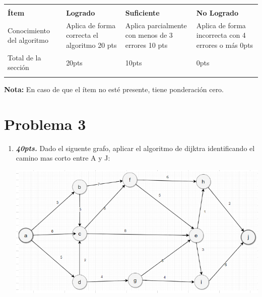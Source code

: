 \documentclass{exam}
\begin{document}
\begin{enumerate}
\begin{questions}
\begin{enumerate}
    \end{enumerate}
  \end{questions}

  \begin{table}[H]
    \centering
    \begin{tabular}{
      !{\color{gray!50}\vrule}p{3.9cm}
      !{\color{gray!50}\vrule}p{3.6cm}
      !{\color{gray!50}\vrule}p{3.6cm}
      !{\color{gray!50}\vrule}p{3.6cm}
      !{\color{gray!50}\vrule}}  \hline
       \\  \hline
      \textbf{Ítem} & \textbf{Logrado} & \textbf{Suficiente} & \textbf{No Logrado}\\  \hline
      Conocimiento del algoritmo &
      Aplica de forma correcta el algoritmo 20 pts   &
      Aplica parcialmente con menos de 3 errores 10 pts  &
      Aplica de forma incorrecta con 4 errores o más 0pts\\  \hline
      Total de la sección &  20pts & 10pts & 0pts\\  \hline
    \end{tabular}
    \label{tbl:1}
  \end{table}
  \vspace{-5mm}
  \textbf{Nota:} En caso de que el {í}tem no est{é} presente, tiene ponderaci{ó}n cero.

  \newpage
  \vspace{-7mm}
  \section{\textbf{Problema 3}}
  \noindent
  \begin{questions}

    \begin{enumerate}

      \item \textbf{\emph{40pts.}} Dado el siguente grafo, aplicar el algoritmo de dijktra identificando el camino mas corto entre A y J:

      \begin{center}
          \includegraphics[width=.9\textwidth]{./img/grafo}
      \end{center}


\end{enumerate}
\end{questions}
\end{enumerate}
\end{document}
